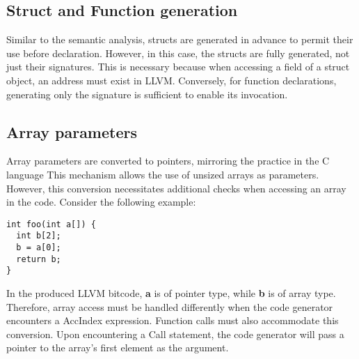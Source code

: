 \documentclass{article}
\begin{document}
\subsection*{Struct and Function generation}
Similar to the semantic analysis, structs are generated in advance to
permit their use before declaration. However, in this case, the structs
are fully generated, not just their signatures.
This is necessary because when accessing a field of a struct object,
an address must exist in LLVM. Conversely, for function declarations,
generating only the signature is sufficient to enable its invocation.

\subsection*{Array parameters}
Array parameters are converted to pointers, mirroring the practice in the C language
This mechanism allows the use of unsized arrays as parameters.
However, this conversion necessitates additional checks when accessing an array in the code.
Consider the following example:
\begin{lstlisting}[basicstyle=\ttfamily\fontsize{8pt}{14pt}, keywordstyle=\color{blue}, commentstyle=\color{green}]
int foo(int a[]) {
  int b[2];
  b = a[0];
  return b;
}
\end{lstlisting}
In the produced LLVM bitcode, \textbf{a} is of pointer type, while \textbf{b} is of array type. Therefore, array access must be handled differently when
the code generator encounters a AccIndex expression.
Function calls must also accommodate this conversion. Upon encountering a Call statement,
the code generator will pass a pointer to the array's first element as the argument.
\end{document}
